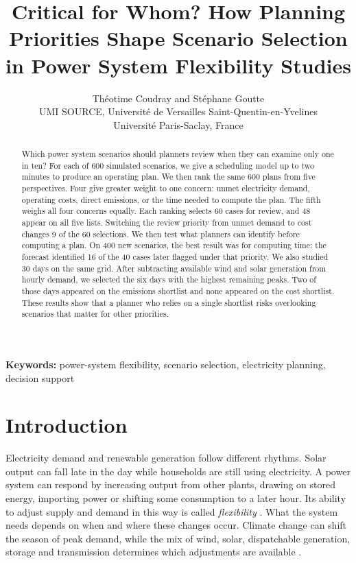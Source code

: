 \documentclass[11pt,a4paper]{article}
\title{Critical for Whom? How Planning Priorities Shape Scenario Selection in Power System Flexibility Studies}
\author{%
  Th\'eotime Coudray and St\'ephane Goutte\\[0.5em]
  \small UMI SOURCE, Universit\'e de Versailles Saint-Quentin-en-Yvelines\\
  \small Universit\'e Paris-Saclay, France
}
\date{}
\begin{document}
\maketitle

\begin{abstract}
Which power system scenarios should planners review when they can examine only one in ten? For each of 600 simulated scenarios, we give a scheduling model up to two minutes to produce an operating plan. We then rank the same 600 plans from five perspectives. Four give greater weight to one concern: unmet electricity demand, operating costs, direct emissions, or the time needed to compute the plan. The fifth weighs all four concerns equally. Each ranking selects 60 cases for review, and 48 appear on all five lists. Switching the review priority from unmet demand to cost changes 9 of the 60 selections. We then test what planners can identify before computing a plan. On 400 new scenarios, the best result was for computing time: the forecast identified 16 of the 40 cases later flagged under that priority. We also studied 30 days on the same grid. After subtracting available wind and solar generation from hourly demand, we selected the six days with the highest remaining peaks. Two of those days appeared on the emissions shortlist and none appeared on the cost shortlist. These results show that a planner who relies on a single shortlist risks overlooking scenarios that matter for other priorities.
\end{abstract}
\noindent\textbf{Keywords:} power-system flexibility, scenario selection, electricity planning, decision support

\section{Introduction}

Electricity demand and renewable generation follow different rhythms. Solar output can fall late in the day while households are still using electricity. A power system can respond by increasing output from other plants, drawing on stored energy, importing power or shifting some consumption to a later hour. Its ability to adjust supply and demand in this way is called \emph{flexibility} \citep{lannoye2012,ulbig2015}. What the system needs depends on when and where these changes occur. Climate change can shift the season of peak demand, while the mix of wind, solar, dispatchable generation, storage and transmission determines which adjustments are available \citep{wenz2017,heggarty2019,brown2018}.
\end{document}
